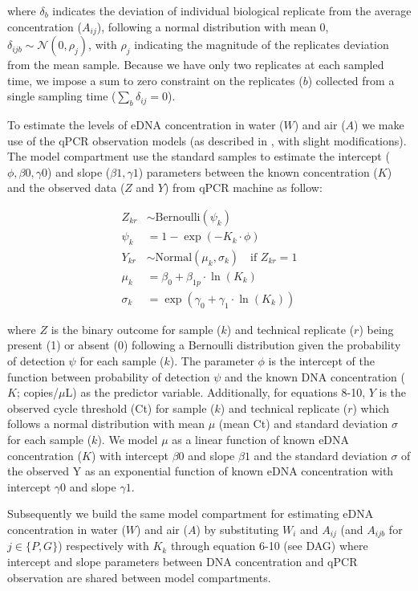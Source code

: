 \documentclass{article}
\begin{document}
where $\delta_b$ indicates the deviation of individual biological replicate from the average concentration ($A_{ij}$), following a normal distribution with mean 0, $\delta_{ijb} \sim \mathcal{N}(0,\rho_j)$, with $\rho_j$ indicating the magnitude of the replicates deviation from the mean sample. Because we have only two replicates at each sampled time, we impose a sum to zero constraint on the replicates ($b$) collected from a single sampling time ($\sum_b \delta_{ij} = 0$).

To estimate the levels of eDNA concentration in water ($W$) and air ($A$) we make use of the qPCR observation models (as described in \cite{guri2024, shelton2022}, with slight modifications). The model compartment use the standard samples to estimate the intercept ($\phi,\beta0,\gamma0$) and slope ($\beta1, \gamma1$) parameters between the known concentration ($K$) and the observed data ($Z$ and $Y$) from qPCR machine as follow:

\begin{align}
    Z_{kr} &\sim \mathrm{Bernoulli} \left(\psi_{k}\right)  \\
    \psi_{k} &= 1 - \exp(-K_{k} \cdot \phi) \\
    Y_{kr} &\sim \mathrm{Normal} (\mu_{k}, \sigma_{k}) \quad \text{if } Z_{kr} = 1 \\
    \mu_{k} &= \beta_0 + \beta_{1p} \cdot \ln (K_{k}) \\
    \sigma_{k} &= \exp(\gamma_0 + \gamma_1 \cdot \ln (K_{k}))
\end{align}

where $Z$ is the binary outcome for sample ($k$) and technical replicate ($r$) being present (1) or absent (0) following a Bernoulli distribution given the probability of detection $\psi$ for each sample ($k$). The parameter $\phi$ is the intercept of the function between probability of detection $\psi$ and the known DNA concentration ($K$; copies/$\mu$L) as the predictor variable. Additionally, for equations 8-10, $Y$ is the observed cycle threshold (Ct) for sample ($k$) and technical replicate ($r$) which follows a normal distribution with mean $\mu$ (mean Ct) and standard deviation $\sigma$ for each sample ($k$). We model $\mu$ as a linear function of known eDNA concentration ($K$) with intercept $\beta0$ and slope $\beta1$ and the standard deviation $\sigma$ of the observed Y as an exponential function of known eDNA concentration with intercept $\gamma0$ and slope $\gamma1$.

Subsequently we build the same model compartment for estimating eDNA concentration in water ($W$) and air ($A$) by substituting $W_i$ and $A_{ij}$ (and $A_{ijb}$ for $j \in \{P,G\}$) respectively with $K_k$ through equation 6-10 (see DAG) where intercept and slope parameters between DNA concentration and qPCR observation are shared between model compartments.
\end{document}

